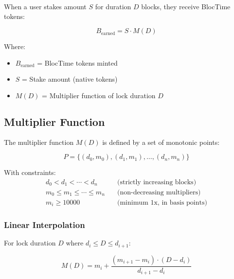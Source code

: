 \documentclass[12pt,a4paper]{article}
\begin{document}
When a user stakes amount $S$ for duration $D$ blocks, they receive BlocTime tokens:

\begin{tcolorbox}[colback=primaryblue!5,colframe=primaryblue,title=Fundamental Minting Equation]
\begin{equation}
\boxed{B_{\text{earned}} = S \cdot M(D)}
\end{equation}

Where:
\begin{itemize}
    \item $B_{\text{earned}}$ = BlocTime tokens minted
    \item $S$ = Stake amount (native tokens)
    \item $M(D)$ = Multiplier function of lock duration $D$
\end{itemize}
\end{tcolorbox}

\subsection{Multiplier Function}

The multiplier function $M(D)$ is defined by a set of monotonic points:

\begin{equation}
P = \{(d_0, m_0), (d_1, m_1), \ldots, (d_n, m_n)\}
\end{equation}

With constraints:
\begin{align}
d_0 < d_1 < \cdots < d_n &\quad \text{(strictly increasing blocks)} \\
m_0 \leq m_1 \leq \cdots \leq m_n &\quad \text{(non-decreasing multipliers)} \\
m_i \geq 10000 &\quad \text{(minimum 1x, in basis points)}
\end{align}

\subsubsection{Linear Interpolation}

For lock duration $D$ where $d_i \leq D \leq d_{i+1}$:

\begin{tcolorbox}[colback=accentgold!5,colframe=accentgold,title=Interpolation Formula]
\begin{equation}
\boxed{M(D) = m_i + \frac{(m_{i+1} - m_i) \cdot (D - d_i)}{d_{i+1} - d_i}}
\end{equation}
\end{tcolorbox}
\end{document}
